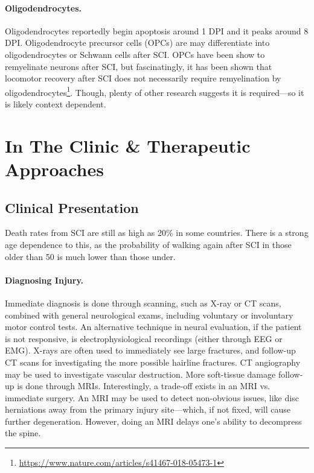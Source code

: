 \documentclass[12pt]{report}
\begin{document}
\subsubsection{Oligodendrocytes.}
Oligodendrocytes reportedly begin apoptosis around 1 DPI and it peaks around 8 DPI. Oligodendrocyte precursor cells (OPCs) are may differentiate into oligodendrocytes or Schwann cells after SCI. OPCs have been show to remyelinate neurons after SCI, but fascinatingly, it has been shown that locomotor recovery after SCI does not necessarily require remyelination by oligodendrocytes\footnote{\url{https://www.nature.com/articles/s41467-018-05473-1}}. Though, plenty of other research suggests it is required---so it is likely context dependent. 

\chapter{In The Clinic \& Therapeutic Approaches}


\section{Clinical Presentation}
Death rates from SCI are still as high as 20\% in some countries. There is a strong age dependence to this, as the probability of walking again after SCI in those older than 50 is much lower than those under.

\subsubsection{Diagnosing Injury.}
Immediate diagnosis is done through scanning, such as X-ray or CT scans, combined with general neurological exams, including voluntary or involuntary motor control tests. An alternative technique in neural evaluation, if the patient is not responsive, is electrophysiological recordings (either through EEG or EMG). X-rays are often used to immediately see large fractures, and follow-up CT scans for investigating the more possible hairline fractures. CT angiography may be used to investigate vascular destruction. More soft-tissue damage follow-up is done through MRIs. Interestingly, a trade-off exists in an MRI vs. immediate surgery. An MRI may be used to detect non-obvious issues, like disc herniations away from the primary injury site---which, if not fixed, will cause further degeneration. However, doing an MRI delays one's ability to decompress the spine.\newline
\end{document}
